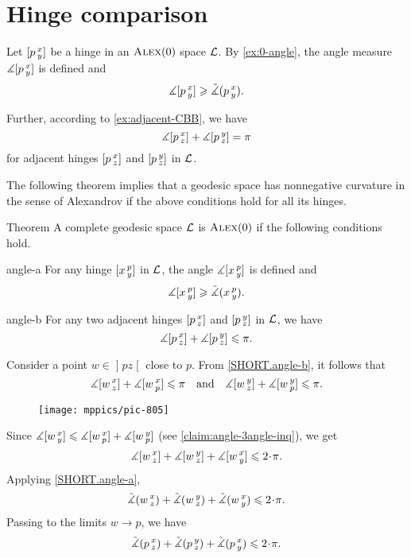 \section{Hinge comparison}

Let $[p\,{}^{x}_{y}]$ be a hinge in an $\textsc{Alex}(0)$ space $\mathcal{L}$.
By \ref{ex:0-angle}, the angle measure $\measuredangle[p\,{}^{x}_{y}]$ is defined and
\[\measuredangle[p\,{}^{x}_{y}]\geqslant \tilde\measuredangle(p\,{}^{x}_{y}).\]

Further, according to \ref{ex:adjacent-CBB}, we have 
\[\measuredangle[p\,{}^{x}_{z}]+\measuredangle[p\,{}^{y}_{z}]=\pi\]
for adjacent hinges $[p\,{}^{x}_{z}]$ and $[p\,{}^{y}_{z}]$ in $\mathcal{L}$.

The following theorem implies that a geodesic space has nonnegative curvature in the sense of Alexandrov if
the above conditions hold for all its hinges.

\begin{thm}{Theorem}\label{thm:angle-cbb}
A complete geodesic space $\mathcal{L}$ is $\textsc{Alex}(0)$ if the following conditions hold.

\begin{subthm}{angle-a}
For any hinge $[x\,{}^{p}_{y}]$ in $\mathcal{L}$, the angle 
$\measuredangle[x\,{}^{p}_{y}]$ is defined and 
\[\measuredangle[x\,{}^{p}_{y}]\geqslant\tilde\measuredangle(x\,{}^{p}_{y}).\]
\end{subthm}

\begin{subthm}{angle-b}
For any two adjacent hinges $[p\,{}^{x}_{z}]$ and $[p\,{}^{y}_{z}]$ in $\mathcal{L}$, we have
\[\measuredangle[p\,{}^{x}_{z}]+\measuredangle[p\,{}^{y}_{z}]\leqslant\pi.\]
\end{subthm}

\end{thm}

Consider a point  $w\in \mathopen{]} p z \mathclose{[}$ close to $p$.
From \ref{SHORT.angle-b}, it follows that 
\[\measuredangle[w\,{}^{x}_{z}]+ \measuredangle[w\,{}^{x}_{p}]\leqslant\pi\quad \text{and}\quad \measuredangle[w\,{}^{y}_{z}] + \measuredangle[w\,{}^{y}_{p}]\leqslant\pi.\]

\begin{wrapfigure}{o}{30 mm}
\vskip-0mm
\centering
\texttt{[image: mppics/pic-805]}
\vskip4mm
\end{wrapfigure}

Since $\measuredangle[w\,{}^{x}_{y}]\leqslant \measuredangle[w\,{}^{x}_{p}] +\measuredangle[w\,{}^{y}_{p}]$ (see \ref{claim:angle-3angle-inq}), we get 
\[\mangle\hinge w x z+ \mangle\hinge w y z +\mangle\hinge w x y
\le
2\cdot\pi.\]
Applying \ref{SHORT.angle-a}, 
\[\angk w x z
+ \angk w y z 
+\angk w x y
\le
2\cdot\pi.\]
Passing to the limits $w\to p$, we have
\[\angk p x z 
+ \angk p y z 
+\angk p x y
\le
2\cdot\pi.\]
\qedsf

